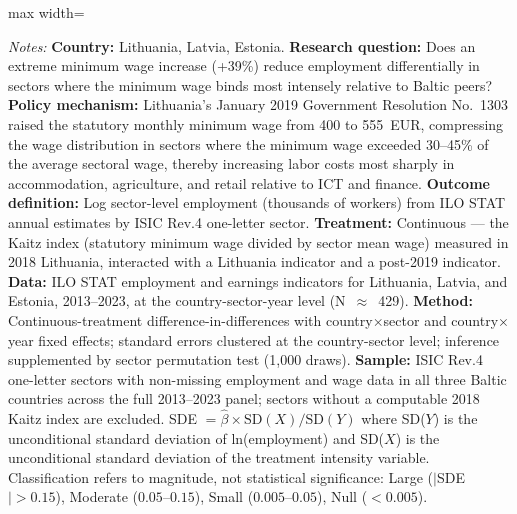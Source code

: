 \begin{table}[H]
\begin{adjustbox}{max width=\textwidth}
\begin{threeparttable}
\begin{tablenotes}[flushleft]
\item \textit{Notes:} \textbf{Country:} Lithuania, Latvia, Estonia. \textbf{Research question:} Does an extreme minimum wage increase (+39\%) reduce employment differentially in sectors where the minimum wage binds most intensely relative to Baltic peers? \textbf{Policy mechanism:} Lithuania's January 2019 Government Resolution No.~1303 raised the statutory monthly minimum wage from 400 to 555~EUR, compressing the wage distribution in sectors where the minimum wage exceeded 30--45\% of the average sectoral wage, thereby increasing labor costs most sharply in accommodation, agriculture, and retail relative to ICT and finance. \textbf{Outcome definition:} Log sector-level employment (thousands of workers) from ILO STAT annual estimates by ISIC Rev.4 one-letter sector. \textbf{Treatment:} Continuous --- the Kaitz index (statutory minimum wage divided by sector mean wage) measured in 2018 Lithuania, interacted with a Lithuania indicator and a post-2019 indicator. \textbf{Data:} ILO STAT employment and earnings indicators for Lithuania, Latvia, and Estonia, 2013--2023, at the country-sector-year level (N~$\approx$~429). \textbf{Method:} Continuous-treatment difference-in-differences with country$\times$sector and country$\times$year fixed effects; standard errors clustered at the country-sector level; inference supplemented by sector permutation test (1,000 draws). \textbf{Sample:} ISIC Rev.4 one-letter sectors with non-missing employment and wage data in all three Baltic countries across the full 2013--2023 panel; sectors without a computable 2018 Kaitz index are excluded. SDE $= \hat{\beta} \times \text{SD}(X) / \text{SD}(Y)$ where SD($Y$) is the unconditional standard deviation of ln(employment) and SD($X$) is the unconditional standard deviation of the treatment intensity variable. Classification refers to magnitude, not statistical significance: Large ($|$SDE$| > 0.15$), Moderate ($0.05$--$0.15$), Small ($0.005$--$0.05$), Null ($< 0.005$).
\end{tablenotes}
\end{threeparttable}
\end{adjustbox}
\end{table}
